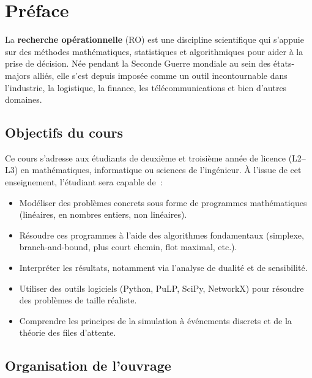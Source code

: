 \chapter*{Pr\'eface}

La \textbf{recherche op\'erationnelle} (RO) est une discipline scientifique qui
s'appuie sur des m\'ethodes math\'ematiques, statistiques et algorithmiques pour
aider \`a la prise de d\'ecision. N\'ee pendant la Seconde Guerre mondiale au sein
des \'etats-majors alli\'es, elle s'est depuis impos\'ee comme un outil
incontournable dans l'industrie, la logistique, la finance, les
t\'el\'ecommunications et bien d'autres domaines.

\section*{Objectifs du cours}

Ce cours s'adresse aux \'etudiants de deuxi\`eme et troisi\`eme ann\'ee de licence
(L2--L3) en math\'ematiques, informatique ou sciences de l'ing\'enieur.
\`A l'issue de cet enseignement, l'\'etudiant sera capable de~:

\begin{itemize}
  \item Mod\'eliser des probl\`emes concrets sous forme de programmes
        math\'ematiques (lin\'eaires, en nombres entiers, non lin\'eaires).
  \item R\'esoudre ces programmes \`a l'aide des algorithmes fondamentaux
        (simplexe, branch-and-bound, plus court chemin, flot maximal, etc.).
  \item Interpr\'eter les r\'esultats, notamment via l'analyse de dualit\'e et de
        sensibilit\'e.
  \item Utiliser des outils logiciels (Python, PuLP, SciPy, NetworkX) pour
        r\'esoudre des probl\`emes de taille r\'ealiste.
  \item Comprendre les principes de la simulation \`a \'ev\'enements discrets et de
        la th\'eorie des files d'attente.
\end{itemize}

\section*{Organisation de l'ouvrage}


